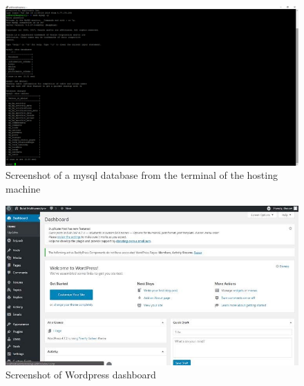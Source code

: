 \documentclass[a4paper, 12pt]{article}
\begin{document}
\begin{figure}[h!]
    \centering
    \includegraphics[width=\linewidth]{mysql.png}
    \caption{Screenshot of a mysql database from the terminal of the hosting machine}
    \label{fig:mysql}
\end{figure}

\begin{figure}[h!]
    \centering
    \includegraphics[width=\linewidth]{word.jpg}
    \caption{Screenshot of Wordpress dashboard}
    \label{fig:word}
\end{figure}
\end{document}
